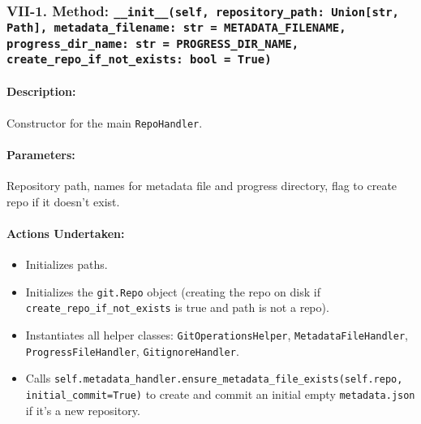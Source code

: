 \documentclass{article}
\begin{document}
\subsubsection{VII-1. Method: \texttt{\_\_init\_\_(self, repository\_path: Union[str, Path], metadata\_filename: str = METADATA\_FILENAME, progress\_dir\_name: str = PROGRESS\_DIR\_NAME, create\_repo\_if\_not\_exists: bool = True)}}
\paragraph{Description:} Constructor for the main \texttt{RepoHandler}.
\paragraph{Parameters:} Repository path, names for metadata file and progress directory, flag to create repo if it doesn't exist.
\paragraph{Actions Undertaken:}
\begin{itemize}
    \item Initializes paths.
    \item Initializes the \texttt{git.Repo} object (creating the repo on disk if \texttt{create\_repo\_if\_not\_exists} is true and path is not a repo).
    \item Instantiates all helper classes: \texttt{GitOperationsHelper}, \texttt{MetadataFileHandler}, \texttt{ProgressFileHandler}, \texttt{GitignoreHandler}.
    \item Calls \texttt{self.metadata\_handler.ensure\_metadata\_file\_exists(self.repo, initial\_commit=True)} to create and commit an initial empty \texttt{metadata.json} if it's a new repository.
\end{itemize}
\end{document}
